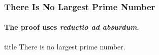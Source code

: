 \documentclass{beamer}
\begin{document}
\begin{frame}
    \frametitle{There Is No Largest Prime Number}
    \framesubtitle{The proof uses \textit{reductio ad absurdum}.}
    \begin{beamercolorbox}[wd=0.5\paperwidth,shadow=true,rounded=true]{title}
        There is no largest prime number.
    \end{beamercolorbox}
\end{frame}
\end{document}
